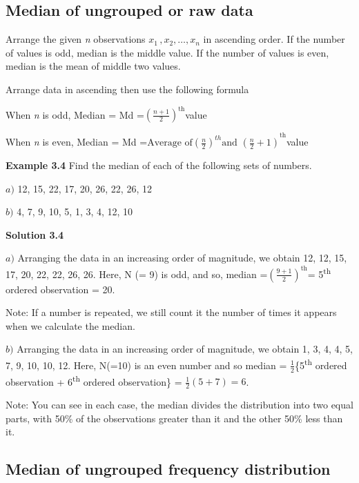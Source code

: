 \documentclass[
]{book}
\begin{document}
\hypertarget{median-of-ungrouped-or-raw-data}{%
\subsection{Median of ungrouped or raw data}\label{median-of-ungrouped-or-raw-data}}

Arrange the given \emph{n} observations \(x_{1\ },x_{2},\ldots,x_{n}\) in
ascending order. If the number of values is odd, median is the middle
value. If the number of values is even, median is the mean of middle two
values.

Arrange data in ascending then use the following formula

When \emph{n} is odd, Median = Md
=\(\left( \frac{n + 1}{2} \right)^{\text{th}}\)value

When \emph{n} is even, Median = Md
=\({\text{Average of}\left( \frac{n}{2} \right)^{th}\text{and }\left( \frac{n}{2} + 1 \right)}^{\text{th}}\)value

\textbf{Example 3.4} Find the median of each of the following sets of
numbers.

\(a)\) 12, 15, 22, 17, 20, 26, 22, 26, 12

\(b)\) 4, 7, 9, 10, 5, 1, 3, 4, 12, 10

\textbf{Solution 3.4}

\(a)\) Arranging the data in an increasing order of magnitude, we obtain
12, 12, 15, 17, 20, 22, 22, 26, 26. Here, N (= 9) is odd, and so, median
=\(\left( \frac{9 + 1}{2} \right)^{\text{th}}\)= 5\textsuperscript{th} ordered observation
= 20.

Note: If a number is repeated, we still count it the number of times it
appears when we calculate the median.

\(b)\) Arranging the data in an increasing order of magnitude, we obtain
1, 3, 4, 4, 5, 7, 9, 10, 10, 12. Here, N(=10) is an even number and so
median = \(\frac{1}{2}\)\{5\textsuperscript{th} ordered observation + 6\textsuperscript{th} ordered
observation\} = \(\frac{1}{2}\left( 5 + 7 \right) = 6\).

Note: You can see in each case, the median divides the distribution into
two equal parts, with 50\% of the observations greater than it and the
other 50\% less than it.

\hypertarget{median-of-ungrouped-frequency-distribution}{%
\subsection{Median of ungrouped frequency distribution}\label{median-of-ungrouped-frequency-distribution}}
\end{document}
